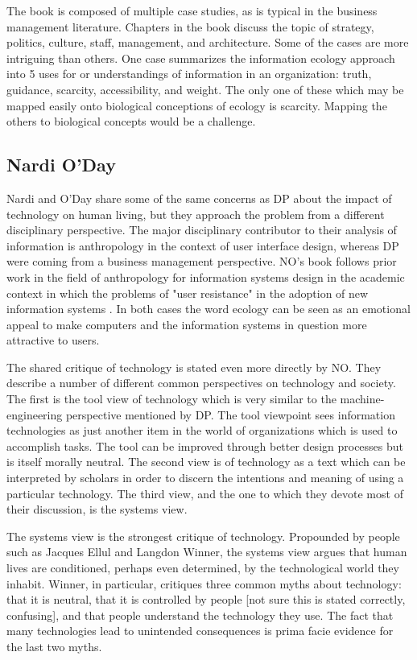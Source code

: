 The book is composed of multiple case studies, as is typical in the business management literature. Chapters in the book discuss the topic of strategy, politics, culture, staff, management, and architecture. Some of the cases are more intriguing than others. One case summarizes the information ecology approach into 5 uses for or understandings of information in an organization: truth, guidance, scarcity, accessibility, and weight. The only one of these which may be mapped easily onto biological conceptions of ecology is scarcity. Mapping the others to biological concepts would be a challenge.

\subsection{Nardi O'Day}

Nardi and O'Day share some of the same concerns as DP about the impact of technology on human living, but they approach the problem from a different disciplinary perspective. The major disciplinary contributor to their analysis of information is anthropology in the context of user interface design, whereas DP were coming from a business management perspective. NO's book follows prior work in the field of anthropology for information systems design in the academic context in which the problems of "user resistance" in the adoption of new information systems \cite{star_1996}. In both cases the word ecology can be seen as an emotional appeal to make computers and the information systems in question more attractive to users.

The shared critique of technology is stated even more directly by NO. They describe a number of different common perspectives on technology and society. The first is the tool view of technology which is very similar to the machine-engineering perspective mentioned by DP. The tool viewpoint sees information technologies as just another item in the world of organizations which is used to accomplish tasks. The tool can be improved through better design processes but is itself morally neutral. The second view is of technology as a text which can be interpreted by scholars in order to discern the intentions and meaning of using a particular technology. The third view, and the one to which they devote most of their discussion, is the systems view.

The systems view is the strongest critique of technology. Propounded by people such as Jacques Ellul and Langdon Winner, the systems view argues that human lives are conditioned, perhaps even determined, by the technological world they inhabit. Winner, in particular, critiques three common myths about technology: that it is neutral, that it is controlled by people [not sure this is stated correctly, confusing], and that people understand the technology they use. The fact that many technologies lead to unintended consequences is prima facie evidence for the last two myths.

